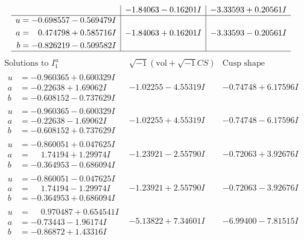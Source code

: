 \documentclass[1p]{elsarticle_modified}
\theoremstyle{definition}
\newcommand{\I}{\sqrt{-1}}
\begin{document}
$$\begin{array}{c|c|c}
 & -1.84063 - 0.16201 I & -3.33593 + 0.20561 I \\ \hline\begin{aligned}
u &= -0.698557 - 0.569479 I \\
a &= \phantom{-}0.474798 + 0.585716 I \\
b &= -0.826219 - 0.509582 I\end{aligned}
 & -1.84063 + 0.16201 I & -3.33593 - 0.20561 I\\
 \hline 
 \end{array}$$\newpage$$\begin{array}{c|c|c}  
\text{Solutions to }I^u_{1}& \I (\text{vol} + \sqrt{-1}CS) & \text{Cusp shape}\\
 \hline 
\begin{aligned}
u &= -0.960365 + 0.600329 I \\
a &= -0.22638 + 1.69062 I \\
b &= -0.608152 - 0.737629 I\end{aligned}
 & -1.02255 - 4.55319 I & -0.74748 + 6.17596 I \\ \hline\begin{aligned}
u &= -0.960365 - 0.600329 I \\
a &= -0.22638 - 1.69062 I \\
b &= -0.608152 + 0.737629 I\end{aligned}
 & -1.02255 + 4.55319 I & -0.74748 - 6.17596 I \\ \hline\begin{aligned}
u &= -0.860051 + 0.047625 I \\
a &= \phantom{-}1.74194 + 1.29974 I \\
b &= -0.364953 - 0.686094 I\end{aligned}
 & -1.23921 - 2.55790 I & -0.72063 + 3.92676 I \\ \hline\begin{aligned}
u &= -0.860051 - 0.047625 I \\
a &= \phantom{-}1.74194 - 1.29974 I \\
b &= -0.364953 + 0.686094 I\end{aligned}
 & -1.23921 + 2.55790 I & -0.72063 - 3.92676 I \\ \hline\begin{aligned}
u &= \phantom{-}0.970487 + 0.654541 I \\
a &= -0.73443 - 1.96174 I \\
b &= -0.86872 + 1.43316 I\end{aligned}
 & -5.13822 + 7.34601 I & -6.99400 - 7.81515 I \\ \hline\begin{aligned}

\end{aligned}
\end{array}$$
\end{document}
